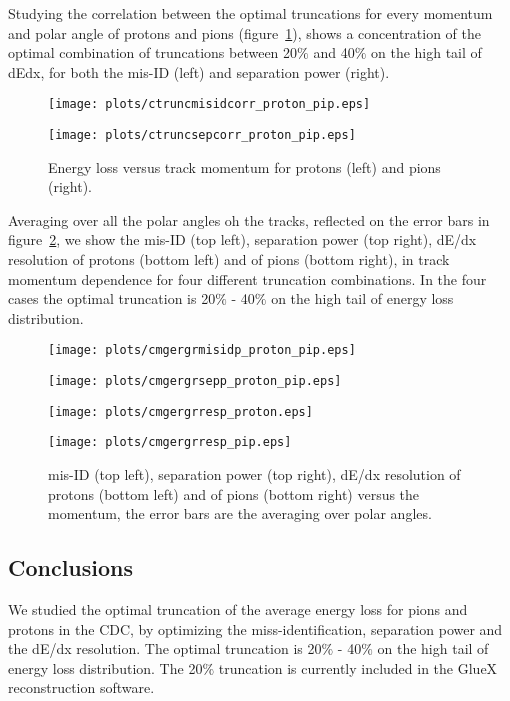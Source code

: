 Studying the correlation between the optimal truncations for every momentum and polar angle of protons and pions (figure~\ref{fig.3.8}), shows a concentration of the optimal combination of truncations between 20$\%$ and 40$\%$ on the high tail of dEdx, for both the mis-ID (left) and separation power (right).
\begin{figure}[h]
    \centering
    \begin{minipage}{18pc}
        \texttt{[image: plots/ctruncmisidcorr\_proton\_pip.eps]}
    \end{minipage}\hspace{3pc}%
    \begin{minipage}{18pc}
        \texttt{[image: plots/ctruncsepcorr\_proton\_pip.eps]}
    \end{minipage}
    \caption{\label{fig.3.8} Energy loss versus track momentum for protons (left) and pions (right).}
\end{figure}
Averaging over all the polar angles oh the tracks, reflected on the error bars in figure~\ref{fig.3.9}, we show the mis-ID (top left), separation power (top right), dE/dx resolution of protons (bottom left) and of pions (bottom right), in track momentum dependence for four different truncation combinations. In the four cases the optimal truncation is 20$\%$ - 40$\%$ on the high tail of energy loss distribution.
\begin{figure}[h]
    \centering
    \begin{minipage}{18pc}
        \texttt{[image: plots/cmgergrmisidp\_proton\_pip.eps]}
    \end{minipage}\hspace{3pc}%
    \begin{minipage}{18pc}
        \texttt{[image: plots/cmgergrsepp\_proton\_pip.eps]}
    \end{minipage}
    \begin{minipage}{18pc}
        \texttt{[image: plots/cmgergrresp\_proton.eps]}
    \end{minipage}\hspace{3pc}%
    \begin{minipage}{18pc}
        \texttt{[image: plots/cmgergrresp\_pip.eps]}
    \end{minipage}
    \caption{\label{fig.3.9} mis-ID (top left), separation power (top right), dE/dx resolution of protons (bottom left) and of pions (bottom right) versus the momentum, the error bars are the averaging over polar angles.}
\end{figure}

\subsection{Conclusions}
We studied the optimal truncation of the average energy loss for pions and protons in the CDC, by optimizing the miss-identification, separation power and the dE/dx resolution. The optimal truncation is 20$\%$ - 40$\%$ on the high tail of energy loss distribution. The 20$\%$ truncation is currently included in the GlueX reconstruction software.

